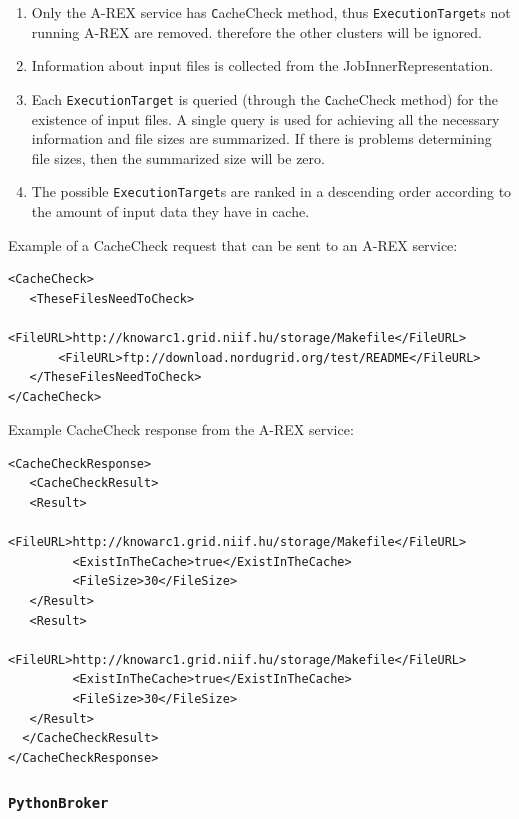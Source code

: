 \documentclass{book}
\newcommand{\PythonBroker}{\texttt{PythonBroker}}
\newcommand{\ExecutionTarget}{\texttt{ExecutionTarget}}
\begin{document}
\begin{enumerate}
\item{Only the A-REX service has {\texttt CacheCheck} method, thus {\ExecutionTarget}s not running A-REX are removed.
therefore the other clusters will be ignored.}
\item{Information about input files is collected from the JobInnerRepresentation.}
\item{Each {\ExecutionTarget} is queried (through the {\texttt CacheCheck} method) for the existence of input files. 
A single query is used for achieving all the necessary information and file sizes are summarized. If there is problems 
determining file sizes, then the summarized size will be zero.}
\item{The possible {\ExecutionTarget}s are ranked in a descending order according to the amount of input data they have in cache.}
\end{enumerate}

Example of a CacheCheck request that can be sent to an A-REX service:

\begin{shaded}
\begin{verbatim}
<CacheCheck>
   <TheseFilesNeedToCheck>
       <FileURL>http://knowarc1.grid.niif.hu/storage/Makefile</FileURL>
       <FileURL>ftp://download.nordugrid.org/test/README</FileURL>
   </TheseFilesNeedToCheck>
</CacheCheck>
\end{verbatim}
\end{shaded}

Example CacheCheck response from the A-REX service:

\begin{shaded}
\begin{verbatim}
<CacheCheckResponse>
   <CacheCheckResult>
   <Result>
         <FileURL>http://knowarc1.grid.niif.hu/storage/Makefile</FileURL>
         <ExistInTheCache>true</ExistInTheCache>
         <FileSize>30</FileSize>
   </Result>
   <Result>
         <FileURL>http://knowarc1.grid.niif.hu/storage/Makefile</FileURL>
         <ExistInTheCache>true</ExistInTheCache>
         <FileSize>30</FileSize>
   </Result>
  </CacheCheckResult>
</CacheCheckResponse>
\end{verbatim}
\end{shaded}
   
\subsubsection{\PythonBroker}
\end{document}
